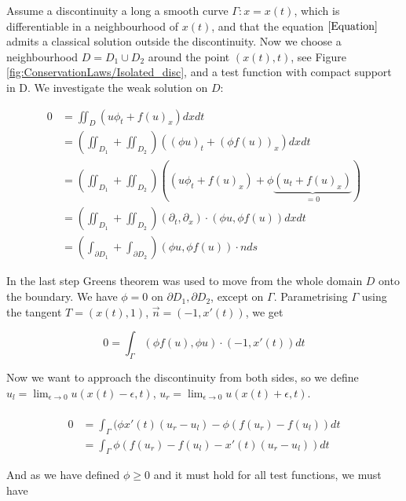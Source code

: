 \documentclass{article}
\numberwithin{equation}{section}
\begin{document}
    
Assume a discontinuity a long a smooth curve $\Gamma : x = x(t)$, which is differentiable in a neighbourhood of $x(t)$, and that the equation $\ref{Equation}$ admits a classical solution outside the discontinuity. Now we choose a neighbourhood $D = D_1 \cup D_2$ around the point $(x(t), t)$, see Figure \ref{fig:ConservationLaws/Isolated_disc}, and a test function with compact support in D. We investigate the weak solution on $D$:


\begin{align*}
    0 &= \iint_D( u \phi_t + f(u)_x) dx dt \\
      &= (\iint_{D_1}  +  \iint_{D_2}  ) ( (\phi u )_t + (\phi f(u))_x ) dxdt \\
      &= (\iint_{D_1}  +  \iint_{D_2}  )( (u \phi_t + f(u)_x) + \phi \underbrace{(u_t + f(u)_x )}_{=0} ) \\
      &= (\iint_{D_1}  +  \iint_{D_2}  ) (\partial_t, \partial_x)\cdot (\phi u, \phi f(u)) dx dt \\
      &= (\int_{\partial D_1}  +  \int_{\partial D_2}  ) (\phi u, \phi f(u)) \cdot n ds
\end{align*}

\vspace{6pt}
In the last step Greens theorem was used to move from the whole domain $D$ onto the boundary. We have $\phi = 0 $ on $\partial D_1, \partial D_2$, except on $\Gamma$. Parametrising $\Gamma$ using the tangent $T = (x(t), 1)$, $\vec{n} = (-1, x'(t))$, we get

\begin{equation}
    0 = \int_{\Gamma} (\phi f(u), \phi u) \cdot (-1, x'(t)) dt
\end{equation}

Now we want to approach the discontinuity from both sides, so we define $u_l = \lim_{\epsilon \to 0} u(x(t) - \epsilon, t)$, $u_r = \lim_{\epsilon \to 0} u(x(t) + \epsilon, t)$.
\\
\\

\begin{align}
    0 &= \int_{\Gamma} (\phi x'(t) (u_r - u_l) - \phi( f(u_r) - f(u_l))  dt \\
      &= \int_{\Gamma} \phi (  f(u_r) - f(u_l) - x'(t)(u_r - u_l) ) dt
\end{align}

\vspace{6pt}
And as we have defined $\phi \geq 0 $ and it must hold for all test functions, we must have
\end{document}
